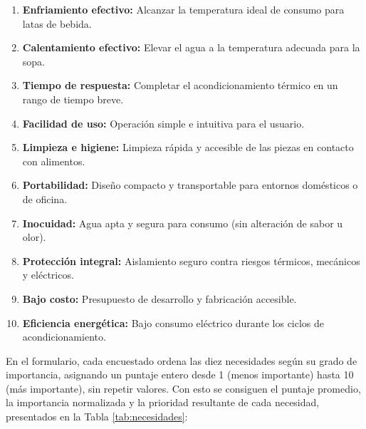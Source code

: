 \documentclass[12pt, a4paper]{article}
\begin{document}
\begin{enumerate}
    \item \textbf{Enfriamiento efectivo:} Alcanzar la temperatura ideal de consumo para latas de bebida.
    \item \textbf{Calentamiento efectivo:} Elevar el agua a la temperatura adecuada para la sopa.
    \item \textbf{Tiempo de respuesta:} Completar el acondicionamiento térmico en un rango de tiempo breve.
    \item \textbf{Facilidad de uso:} Operación simple e intuitiva para el usuario.
    \item \textbf{Limpieza e higiene:} Limpieza rápida y accesible de las piezas en contacto con alimentos.
    \item \textbf{Portabilidad:} Diseño compacto y transportable para entornos domésticos o de oficina.
    \item \textbf{Inocuidad:} Agua apta y segura para consumo (sin alteración de sabor u olor).
    \item \textbf{Protección integral:} Aislamiento seguro contra riesgos térmicos, mecánicos y eléctricos.
    \item \textbf{Bajo costo:} Presupuesto de desarrollo y fabricación accesible.
    \item \textbf{Eficiencia energética:} Bajo consumo eléctrico durante los ciclos de acondicionamiento.
\end{enumerate}

En el formulario, cada encuestado ordena las diez necesidades según su grado de importancia, asignando un puntaje entero desde 1 (menos importante) hasta 10 (más importante), sin repetir valores. Con esto se consiguen el puntaje promedio, la importancia normalizada y la prioridad resultante de cada necesidad, presentados en la Tabla \ref{tab:necesidades}:
\end{document}
